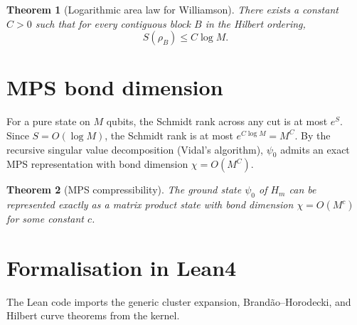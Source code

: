 \documentclass[11pt,a4paper]{article}
\newtheorem{theorem}{Theorem}[section]
\begin{document}
\begin{theorem}[Logarithmic area law for Williamson]\label{thm:logarea}
There exists a constant $C>0$ such that for every contiguous block $B$ in the Hilbert ordering,
\[
S(\rho_B) \le C \log M.
\]
\end{theorem}

\section{MPS bond dimension}

For a pure state on $M$ qubits, the Schmidt rank across any cut is at most $e^{S}$. Since $S = O(\log M)$, the Schmidt rank is at most $e^{C\log M} = M^{C}$. By the recursive singular value decomposition (Vidal's algorithm), $\psi_0$ admits an exact MPS representation with bond dimension $\chi = O(M^{C})$.

\begin{theorem}[MPS compressibility]\label{thm:mps}
The ground state $\psi_0$ of $H_m$ can be represented exactly as a matrix product state with bond dimension $\chi = O(M^c)$ for some constant $c$.
\end{theorem}

\section{Formalisation in Lean4}

The Lean code imports the generic cluster expansion, Brandão–Horodecki, and Hilbert curve theorems from the kernel.
\end{document}
